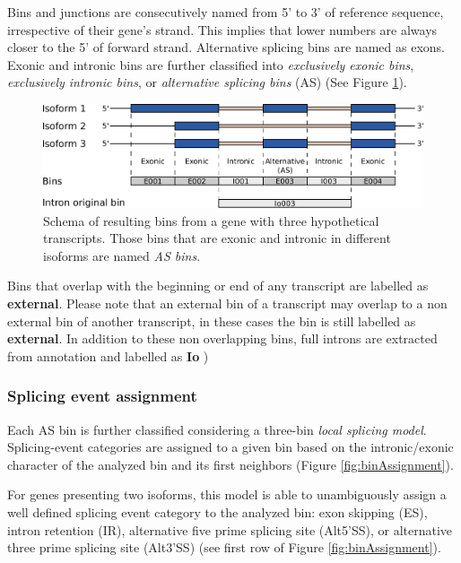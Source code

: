 \documentclass{article}
\begin{document}
Bins and junctions are consecutively named from 5' to 3' of reference sequence, irrespective of their gene's strand. This implies that lower numbers are always closer to the 5' of forward strand. Alternative splicing bins are named as exons.\\


Exonic and intronic bins are further classified into {\em exclusively exonic bins}, {\em exclusively intronic bins}, or {\em alternative splicing bins} (AS) (See Figure \ref{fig:binDefinition}). 

\begin{figure}[ht!]
\centering
\includegraphics[width=12cm]{images/binDefinition.pdf}
\caption{ Schema of resulting bins from a gene with three hypothetical
  transcripts. Those bins that are exonic and intronic in different isoforms are     named \textit{AS bins}.
}
\label{fig:binDefinition}
\end{figure}


Bins that overlap with the beginning or end of any transcript are labelled as \textbf{external}. Please note that an external bin of a transcript may overlap to a non external bin of another transcript, in these cases the bin is still labelled as \textbf{external}. In addition to these non overlapping bins, full introns are extracted from annotation and labelled as \textbf{Io} )

\subsubsection{Splicing event assignment} \label{sec:eventAssign}

Each AS bin is further classified considering a three-bin {\em local splicing model}. Splicing-event categories are assigned to a given bin based on the intronic/exonic character of the analyzed bin and its first neighbors (Figure \ref{fig:binAssignment}). 

For genes presenting two isoforms, this model is able to unambiguously assign a well defined splicing event category to the analyzed bin: exon skipping (ES),  intron retention (IR), alternative five prime splicing site (Alt5'SS), or alternative three prime splicing site (Alt3'SS) (see first row of Figure \ref{fig:binAssignment}).
\end{document}
